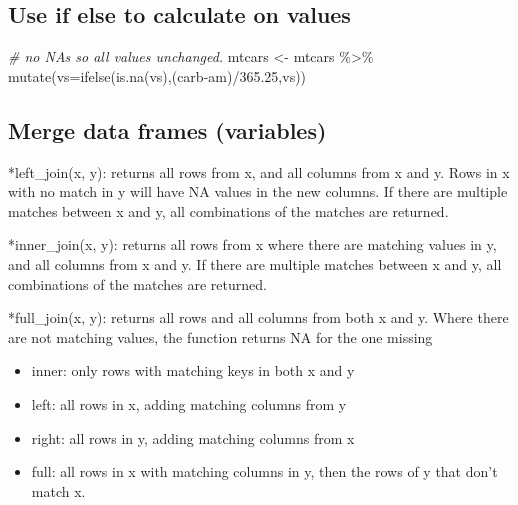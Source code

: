 \documentclass[
]{article}
\newenvironment{Shaded}{\begin{snugshade}}{\end{snugshade}}
\newcommand{\AttributeTok}[1]{\textcolor[rgb]{0.77,0.63,0.00}{#1}}
\newcommand{\CommentTok}[1]{\textcolor[rgb]{0.56,0.35,0.01}{\textit{#1}}}
\newcommand{\FloatTok}[1]{\textcolor[rgb]{0.00,0.00,0.81}{#1}}
\newcommand{\FunctionTok}[1]{\textcolor[rgb]{0.00,0.00,0.00}{#1}}
\newcommand{\NormalTok}[1]{#1}
\newcommand{\OtherTok}[1]{\textcolor[rgb]{0.56,0.35,0.01}{#1}}
\newcommand{\SpecialCharTok}[1]{\textcolor[rgb]{0.00,0.00,0.00}{#1}}
\providecommand{\tightlist}{%
  \setlength{\itemsep}{0pt}\setlength{\parskip}{0pt}}
\begin{document}
\hypertarget{use-if-else-to-calculate-on-values}{%
\subsection{Use if else to calculate on values}\label{use-if-else-to-calculate-on-values}}

\begin{Shaded}
\begin{Highlighting}[]
\CommentTok{\# no NA\textquotesingle{}s so all values unchanged.}
\NormalTok{mtcars }\OtherTok{\textless{}{-}}\NormalTok{ mtcars }\SpecialCharTok{\%\textgreater{}\%} \FunctionTok{mutate}\NormalTok{(}\AttributeTok{vs=}\FunctionTok{ifelse}\NormalTok{(}\FunctionTok{is.na}\NormalTok{(vs),(carb}\SpecialCharTok{{-}}\NormalTok{am)}\SpecialCharTok{/}\FloatTok{365.25}\NormalTok{,vs)) }
\end{Highlighting}
\end{Shaded}

\hypertarget{merge-data-frames-variables}{%
\subsection{Merge data frames (variables)}\label{merge-data-frames-variables}}

*left\_join(x, y): returns all rows from x, and all columns from x and y. Rows in x with no match in y will have NA values in the new columns. If there are multiple matches between x and y, all combinations of the matches are returned.

*inner\_join(x, y): returns all rows from x where there are matching values in y, and all columns from x and y. If there are multiple matches between x and y, all combinations of the matches are returned.

*full\_join(x, y): returns all rows and all columns from both x and y. Where there are not matching values, the function returns NA for the one missing

\begin{itemize}
\tightlist
\item
  inner: only rows with matching keys in both x and y
\item
  left: all rows in x, adding matching columns from y
\item
  right: all rows in y, adding matching columns from x
\item
  full: all rows in x with matching columns in y, then the rows of y that don't match x.
\end{itemize}
\end{document}
